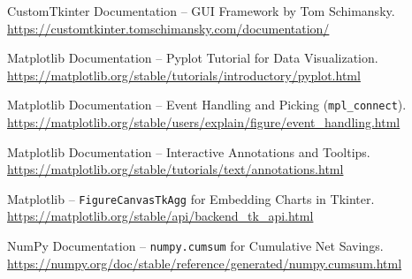 \documentclass[12pt, a4paper]{article}
\begin{document}
\begin{enumerate}[leftmargin=2em, label={[\arabic*]}]
  \item CustomTkinter Documentation -- GUI Framework by Tom Schimansky.\\
        \url{https://customtkinter.tomschimansky.com/documentation/}

  \item Matplotlib Documentation -- Pyplot Tutorial for Data Visualization.\\
        \url{https://matplotlib.org/stable/tutorials/introductory/pyplot.html}

  \item Matplotlib Documentation -- Event Handling and Picking (\texttt{mpl\_connect}).\\
        \url{https://matplotlib.org/stable/users/explain/figure/event_handling.html}

  \item Matplotlib Documentation -- Interactive Annotations and Tooltips.\\
        \url{https://matplotlib.org/stable/tutorials/text/annotations.html}

  \item Matplotlib -- \texttt{FigureCanvasTkAgg} for Embedding Charts in Tkinter.\\
        \url{https://matplotlib.org/stable/api/backend_tk_api.html}

  \item NumPy Documentation -- \texttt{numpy.cumsum} for Cumulative Net Savings.\\
        \url{https://numpy.org/doc/stable/reference/generated/numpy.cumsum.html}

\end{enumerate}
\end{document}
